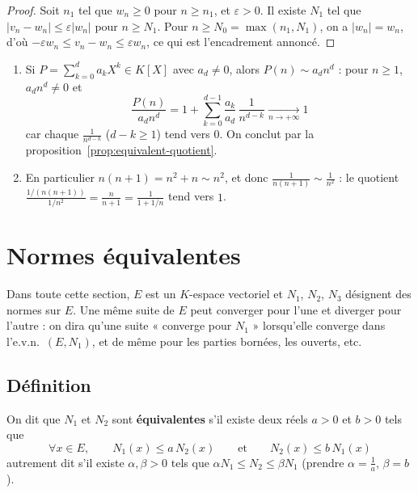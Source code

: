 \begin{proof}
Soit $n_1$ tel que $w_n\geq 0$ pour $n\geq n_1$, et $\varepsilon>0$. Il existe $N_1$ tel que $|v_n-w_n|\leq\varepsilon|w_n|$ pour $n\geq N_1$. Pour $n\geq N_0=\max(n_1,N_1)$, on a $|w_n|=w_n$, d'où $-\varepsilon w_n\leq v_n-w_n\leq\varepsilon w_n$, ce qui est l'encadrement annoncé.
\end{proof}

\begin{exemple}
\label{ex:equivalents-usuels}
\begin{enumerate}
\item Si $P=\sum_{k=0}^{d}a_kX^k\in K[X]$ avec $a_d\neq 0$, alors $P(n)\sim a_dn^d$ : pour $n\geq 1$, $a_dn^d\neq 0$ et
\[\frac{P(n)}{a_dn^d} = 1+\sum_{k=0}^{d-1}\frac{a_k}{a_d}\,\frac{1}{n^{d-k}}\xrightarrow[n\to+\infty]{}1\]
car chaque $\frac{1}{n^{d-k}}$ ($d-k\geq 1$) tend vers $0$. On conclut par la proposition~\ref{prop:equivalent-quotient}.
\item En particulier $n(n+1)=n^2+n\sim n^2$, et donc $\frac{1}{n(n+1)}\sim\frac{1}{n^2}$ : le quotient $\frac{1/(n(n+1))}{1/n^2}=\frac{n}{n+1}=\frac{1}{1+1/n}$ tend vers $1$.
\end{enumerate}
\end{exemple}

\section{Normes équivalentes}
\label{sec:normes-equivalentes}

Dans toute cette section, $E$ est un $K$-espace vectoriel et $N_1$, $N_2$, $N_3$ désignent des normes sur $E$. Une même suite de $E$ peut converger pour l'une et diverger pour l'autre : on dira qu'une suite « converge pour $N_1$ » lorsqu'elle converge dans l'e.v.n.\ $(E,N_1)$, et de même pour les parties bornées, les ouverts, etc.

\subsection{Définition}

\begin{defi}
\label{defi:normes-equivalentes}
On dit que $N_1$ et $N_2$ sont \textbf{équivalentes} s'il existe deux réels $a>0$ et $b>0$ tels que
\[\forall x\in E,\qquad N_1(x)\leq a\,N_2(x) \qquad\text{et}\qquad N_2(x)\leq b\,N_1(x)\]
autrement dit s'il existe $\alpha,\beta>0$ tels que $\alpha N_1\leq N_2\leq\beta N_1$ (prendre $\alpha=\frac1a$, $\beta=b$).
\end{defi}

